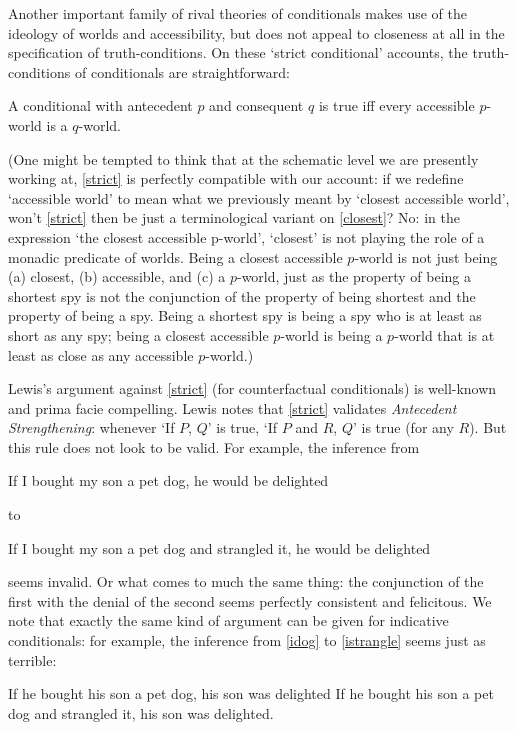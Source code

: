 \documentclass[If.tex]{subfiles}
\begin{document}
Another important family of rival theories of conditionals makes use of the ideology of worlds and accessibility, but does not appeal to closeness at all in the specification of truth-conditions. On these ‘strict conditional’ accounts, the truth-conditions of conditionals are straightforward:
\begin{prop}
\litem[STRICT] \label{strict}
	A conditional with antecedent $p$ and consequent $q$ is true iff every accessible $p$-world is a $q$-world.
\end{prop}
(One might be tempted to think that at the schematic level we are
presently working at, \ref{strict} is perfectly compatible with our account:
if we redefine ‘accessible world’ to mean what we previously meant by
‘closest accessible world’, won't \ref{strict} then be just a terminological
variant on \ref{closest}? No: in the expression ‘the closest accessible
p-world’, ‘closest’ is not playing the role of a monadic predicate of
worlds. Being a closest accessible $p$-world is not just being (a)
closest, (b) accessible, and (c) a $p$-world, just as the property of
being a shortest spy is not the conjunction of the property of being
shortest and the property of being a spy. Being a shortest spy is being
a spy who is at least as short as any spy; being a closest accessible
$p$-world is being a $p$-world that is at least as close as any accessible
$p$-world.)

Lewis's argument against \ref{strict} (for counterfactual conditionals) is
well-known and prima facie compelling. Lewis notes that \ref{strict} validates
\emph{Antecedent Strengthening}: whenever ‘If $P$, $Q$’ is true, ‘If $P$
and $R$, $Q$’ is true (for any $R$). But this rule does not look to be valid. For example, the inference
from
\begin{prop}
	\nitem \label{dog}
	If I bought my son a pet dog, he would be delighted
\end{prop}
to
\begin{prop}
	\nitem \label{strangle}
	If I bought my son a pet dog and strangled it, he would be delighted
\end{prop}
seems invalid. Or what comes to much the same thing: the conjunction of the first with the denial of the second seems perfectly consistent and felicitous. We note that exactly the same kind of argument can be given for indicative conditionals: for example, the inference from \ref{idog} to \ref{istrangle} seems just as terrible:
\begin{prop}
	\nitem \label{idog}
	If he bought his son a pet dog, his son was delighted
	\nitem \label{istrangle}
	If he bought his son a pet dog and strangled it, his son was delighted.
\end{prop}
\end{document}
